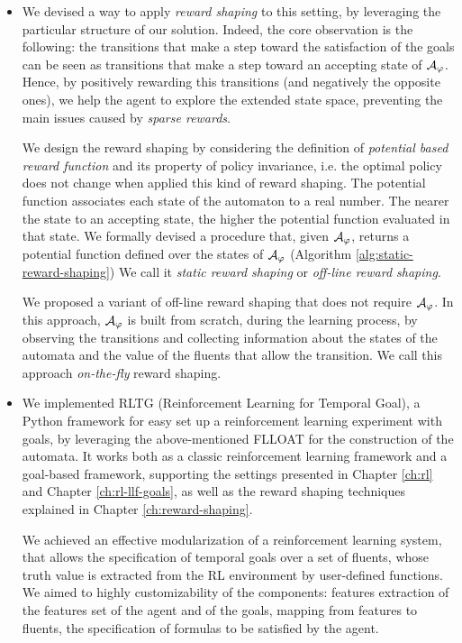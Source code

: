 \begin{itemize}
	\item We devised a way to apply \emph{reward shaping} to this setting, by leveraging the particular structure of our solution. Indeed, the core observation is the following: the transitions that make a step toward the satisfaction of the \LLf goals can be seen as transitions that make a step toward an accepting state of $\mathcal{A}_\varphi$. Hence, by positively rewarding this transitions (and negatively the opposite ones), we help the agent to explore the extended state space, preventing the main issues caused by \emph{sparse rewards}.
	
	We design the reward shaping by considering the definition of \emph{potential based reward function} \citep{Ng:1999:PIU:645528.657613} and its property of policy invariance, i.e. the optimal policy does not change when applied this kind of reward shaping. The potential function associates each state of the automaton to a real number. The nearer the state to an accepting state, the higher the potential function evaluated in that state. We formally devised a procedure that, given $\mathcal{A}_\varphi$, returns a potential function defined over the states of $\mathcal{A}_\varphi$ (Algorithm \ref{alg:static-reward-shaping}) We call it \emph{static reward shaping} or \emph{off-line reward shaping}.
	
	We proposed a variant of off-line reward shaping that does not require $\mathcal{A}_\varphi$. In this approach, $\mathcal{A}_\varphi$ is built from scratch, during the learning process, by observing the transitions and collecting information about the states of the automata and the value of the fluents that allow the transition. We call this approach \emph{on-the-fly} reward shaping.
	
	\item We implemented RLTG (Reinforcement Learning for Temporal Goal), a Python framework for easy set up a reinforcement learning experiment with \LLf goals, by leveraging the above-mentioned FLLOAT for the construction of the automata. It works both as a classic reinforcement learning framework and a \LLf goal-based framework, supporting the settings presented in Chapter \ref{ch:rl} and Chapter \ref{ch:rl-llf-goals}, as well as the reward shaping techniques explained in Chapter \ref{ch:reward-shaping}.
	
	We achieved an effective modularization of a reinforcement learning system, that allows the specification of temporal goals over a set of fluents, whose truth value is extracted from the RL environment by user-defined functions. We aimed to highly customizability of the components: features extraction of the features set of the agent and of the \LLf goals, mapping from features to fluents, the specification of \LLf formulas to be satisfied by the agent. 
	

\end{itemize}
